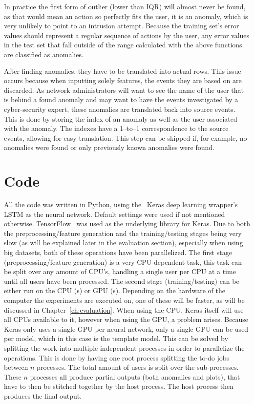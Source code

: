 In practice the first form of outlier (lower than IQR) will almost never be found, as that would mean an action so perfectly fits the user, it is an anomaly, which is very unlikely to point to an intrusion attempt. Because the training set's error values should represent a regular sequence of actions by the user, any error values in the test set that fall outside of the range calculated with the above functions are classified as anomalies.

After finding anomalies, they have to be translated into actual rows. This issue occurs because when inputting solely features, the events they are based on are discarded. As network administrators will want to see the name of the user that is behind a found anomaly and may want to have the events investigated by a cyber-security expert, these anomalies are translated back into source events. This is done by storing the index of an anomaly as well as the user associated with the anomaly. The indexes have a 1--to--1 correspondence to the source events, allowing for easy translation. This step can be skipped if, for example, no anomalies were found or only previously known anomalies were found.

\section{Code}
All the code was written in Python, using the~\cite{chollet2015keras} Keras deep learning wrapper's LSTM as the neural network. Default settings were used if not mentioned otherwise. TensorFlow~\cite{tensorflow2015-whitepaper} was used as the underlying library for Keras. Due to both the preprocessing/feature generation and the training/testing stages being very slow (as will be explained later in the evaluation section), especially when using big datasets, both of these operations have been parallelized. The first stage (preprocessing/feature generation) is a very CPU-dependent task, this task can be split over any amount of CPU's, handling a single user per CPU at a time until all users have been processed. The second stage (training/testing) can be either run on the CPU (s) or GPU (s). Depending on the hardware of the computer the experiments are executed on, one of these will be faster, as will be discussed in Chapter~\ref{ch:evaluation}. When using the CPU, Keras itself will use all CPUs available to it, however when using the GPU, a problem arises. Because Keras only uses a single GPU per neural network, only a single GPU can be used per model, which in this case is the template model. This can be solved by splitting the work into multiple independent processes in order to parallelize the operations. This is done by having one root process splitting the to-do jobs between \(n\) processes. The total amount of users is split over the sub-processes. These \(n\) processes all produce partial outputs (both anomalies and plots), that have to then be stitched together by the host process. The host process then produces the final output.